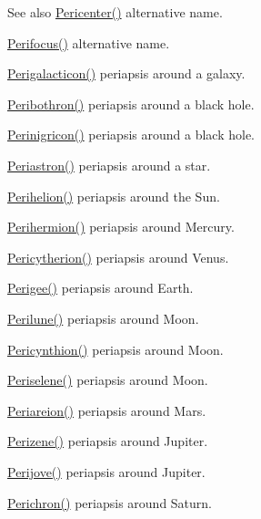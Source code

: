\begin{DoxySeeAlso}{See also}
\hyperlink{group___e_g_x_phys-_periapsis_gac4c419a87a5802cf6afc98f50792e99f}{Pericenter()} alternative name. 

\hyperlink{group___e_g_x_phys-_periapsis_gaff62669fb364a245cb85f9a91d8ea71f}{Perifocus()} alternative name. 

\hyperlink{group___e_g_x_phys-_periapsis_ga074fecab96b90bebffa512a37e52d90b}{Perigalacticon()} periapsis around a galaxy. 

\hyperlink{group___e_g_x_phys-_periapsis_gada5892309279a3a687c4eb2f88238e4e}{Peribothron()} periapsis around a black hole. 

\hyperlink{group___e_g_x_phys-_periapsis_ga99d86af90179994e17158b082c502fd4}{Perinigricon()} periapsis around a black hole. 

\hyperlink{group___e_g_x_phys-_periapsis_ga477de6824cbb5986cdae923141e21648}{Periastron()} periapsis around a star. 

\hyperlink{group___e_g_x_phys-_periapsis_ga941d285e3a0b48ada9c9f60925ff63c2}{Perihelion()} periapsis around the Sun. 

\hyperlink{group___e_g_x_phys-_periapsis_ga9562e9cbfd73019ae9cdaa643b843d63}{Perihermion()} periapsis around Mercury. 

\hyperlink{group___e_g_x_phys-_periapsis_gaa270e364cbbd7d3d6212872df484926f}{Pericytherion()} periapsis around Venus. 

\hyperlink{group___e_g_x_phys-_periapsis_gae2d053caf69cb0b4c3207064a2ab143a}{Perigee()} periapsis around Earth. 

\hyperlink{group___e_g_x_phys-_periapsis_ga2cc7ab05e18d32c94d8d74972e032793}{Perilune()} periapsis around Moon. 

\hyperlink{group___e_g_x_phys-_periapsis_gaeeba153b188cd06cbd233eaef12f0a6a}{Pericynthion()} periapsis around Moon. 

\hyperlink{group___e_g_x_phys-_periapsis_ga255874374dde571531e443cdbef9ef0c}{Periselene()} periapsis around Moon. 

\hyperlink{group___e_g_x_phys-_periapsis_ga0617ba07a30b0fd0544c02f691bfae26}{Periareion()} periapsis around Mars. 

\hyperlink{group___e_g_x_phys-_periapsis_ga0523c65b7fc26e675388b2c3d38aa00b}{Perizene()} periapsis around Jupiter. 

\hyperlink{group___e_g_x_phys-_periapsis_ga075052f7ff9aa1d5fdf4501b493be86b}{Perijove()} periapsis around Jupiter. 

\hyperlink{group___e_g_x_phys-_periapsis_ga12b5e99aa2e3e7031ef6ce93060cf516}{Perichron()} periapsis around Saturn. 


\end{DoxySeeAlso}
